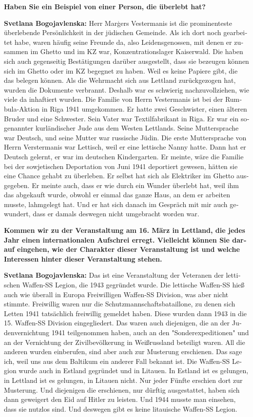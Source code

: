 \begin{otherlanguage}{ngerman}
\textbf{Haben Sie ein Beispiel von einer Person, die überlebt hat?}

\textbf{Svetlana Bogojavlenska:}  Herr Marģers Vestermanis ist die prominenteste überlebende Persönlichkeit in der jüdischen Gemeinde. Als ich dort noch gearbeitet habe, waren häufig seine Freunde da, also Leidensgenossen, mit denen er zusammen im Ghetto und im KZ war, Konzentrationslager Kaiserwald. Die haben sich auch gegenseitig Bestätigungen darüber ausgestellt, dass sie bezeugen können sich im Ghetto oder im KZ begegnet zu haben. Weil es keine Papiere gibt, die das belegen können. Als die Wehrmacht sich aus Lettland zurückgezogen hat, wurden die Dokumente verbrannt. Deshalb war es schwierig nachzuvollziehen, wie viele da inhaftiert wurden. Die Familie von Herrn Vestermanis ist bei der Rumbula-Aktion in Riga 1941 umgekommen. Er hatte zwei Geschwister, einen älteren Bruder und eine Schwester. Sein Vater war Textilfabrikant in Riga. Er war ein sogenannter kurländischer Jude aus dem Westen Lettlands. Seine Muttersprache war Deutsch, und seine Mutter war russische Jüdin. Die erste Muttersprache von Herrn Verstermanis war Lettisch, weil er eine lettische Nanny hatte. Dann hat er Deutsch gelernt, er war im deutschen Kindergarten. Er meinte, wäre die Familie bei der sowjetischen Deportation von Juni 1941 deportiert gewesen, hätten sie eine Chance gehabt zu überleben. Er selbst hat sich als Elektriker im Ghetto ausgegeben. Er meinte auch, dass er wie durch ein Wunder überlebt hat, weil ihm das abgekauft wurde, obwohl er einmal das ganze Haus, an dem er arbeiten musste, lahmgelegt hat. Und er hat sich danach im Gespräch mit mir auch gewundert, dass er damals deswegen nicht umgebracht worden war.

\textbf{Kommen wir zu der Veranstaltung am 16. März in Lettland, die jedes Jahr einen internationalen Aufschrei erregt. Vielleicht können Sie darauf eingehen, wie der Charakter dieser Veranstaltung ist und welche Interessen hinter dieser Veranstaltung stehen.}

\textbf{Svetlana Bogojavlenska:} Das ist eine Veranstaltung der Veteranen der lettischen Waffen-SS Legion, die 1943 gegründet wurde. Die lettische Waffen-SS hieß auch wie überall in Europa Freiwilligen Waffen-SS Division, was aber nicht stimmte. Freiwillig waren nur die Schutzmannschaftsbataillone, zu denen sich Letten 1941 tatsächlich freiwillig gemeldet haben. Diese wurden dann 1943 in die 15. Waffen-SS Division eingegliedert. Das waren auch diejenigen, die an der Judenvernichtung 1941 teilgenommen haben, auch an den "Sonderexpeditionen" und an der Vernichtung der Zivilbevölkerung in Weißrussland beteiligt waren. All die anderen wurden einberufen, sind aber auch zur Musterung erschienen. Das sage ich, weil uns aus dem Baltikum ein anderer Fall bekannt ist. Die Waffen-SS Legion wurde auch in Estland gegründet und in Litauen. In Estland ist es gelungen, in Lettland ist es gelungen, in Litauen nicht. Nur jeder Fünfte erschien dort zur Musterung. Und diejenigen die erschienen, nur dürftig ausgestattet, haben sich dann geweigert den Eid auf Hitler zu leisten. Und 1944 musste man einsehen, dass sie nutzlos sind. Und deswegen gibt es keine litauische Waffen-SS Legion. 


\end{otherlanguage}
